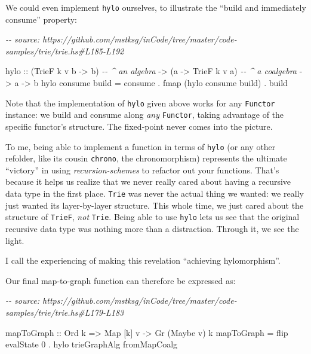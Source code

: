 \documentclass[]{article}
\newenvironment{Shaded}{}{}
\newcommand{\CommentTok}[1]{\textcolor[rgb]{0.38,0.63,0.69}{\textit{#1}}}
\newcommand{\DataTypeTok}[1]{\textcolor[rgb]{0.56,0.13,0.00}{#1}}
\newcommand{\DecValTok}[1]{\textcolor[rgb]{0.25,0.63,0.44}{#1}}
\newcommand{\FunctionTok}[1]{\textcolor[rgb]{0.02,0.16,0.49}{#1}}
\newcommand{\NormalTok}[1]{#1}
\newcommand{\OperatorTok}[1]{\textcolor[rgb]{0.40,0.40,0.40}{#1}}
\newcommand{\OtherTok}[1]{\textcolor[rgb]{0.00,0.44,0.13}{#1}}
\begin{document}
We could even implement \texttt{hylo} ourselves, to illustrate the ``build and
immediately consume'' property:

\begin{Shaded}
\begin{Highlighting}[]
\CommentTok{{-}{-} source: https://github.com/mstksg/inCode/tree/master/code{-}samples/trie/trie.hs\#L185{-}L192}

\NormalTok{hylo\textquotesingle{}}
\OtherTok{    ::}\NormalTok{ (}\DataTypeTok{TrieF}\NormalTok{ k v b }\OtherTok{{-}\textgreater{}}\NormalTok{ b)   }\CommentTok{{-}{-} \^{} an algebra}
    \OtherTok{{-}\textgreater{}}\NormalTok{ (a }\OtherTok{{-}\textgreater{}} \DataTypeTok{TrieF}\NormalTok{ k v a)   }\CommentTok{{-}{-} \^{} a coalgebra}
    \OtherTok{{-}\textgreater{}}\NormalTok{ a}
    \OtherTok{{-}\textgreater{}}\NormalTok{ b}
\NormalTok{hylo\textquotesingle{} consume build }\OtherTok{=}\NormalTok{ consume}
                    \OperatorTok{.} \FunctionTok{fmap}\NormalTok{ (hylo\textquotesingle{} consume build)}
                    \OperatorTok{.}\NormalTok{ build}
\end{Highlighting}
\end{Shaded}

Note that the implementation of \texttt{hylo} given above works for any
\texttt{Functor} instance: we build and consume along \emph{any}
\texttt{Functor}, taking advantage of the specific functor's structure. The
fixed-point never comes into the picture.

To me, being able to implement a function in terms of \texttt{hylo} (or any
other refolder, like its cousin \texttt{chrono}, the chronomorphism) represents
the ultimate ``victory'' in using \emph{recursion-schemes} to refactor out your
functions. That's because it helps us realize that we never really cared about
having a recursive data type in the first place. \texttt{Trie} was never the
actual thing we wanted: we really just wanted its layer-by-layer structure. This
whole time, we just cared about the structure of \texttt{TrieF}, \emph{not}
\texttt{Trie}. Being able to use \texttt{hylo} lets us see that the original
recursive data type was nothing more than a distraction. Through it, we see the
light.

I call the experiencing of making this revelation ``achieving hylomorphism''.

Our final map-to-graph function can therefore be expressed as:

\begin{Shaded}
\begin{Highlighting}[]
\CommentTok{{-}{-} source: https://github.com/mstksg/inCode/tree/master/code{-}samples/trie/trie.hs\#L179{-}L183}

\NormalTok{mapToGraph}
\OtherTok{    ::} \DataTypeTok{Ord}\NormalTok{ k}
    \OtherTok{=\textgreater{}} \DataTypeTok{Map}\NormalTok{ [k] v}
    \OtherTok{{-}\textgreater{}} \DataTypeTok{Gr}\NormalTok{ (}\DataTypeTok{Maybe}\NormalTok{ v) k}
\NormalTok{mapToGraph }\OtherTok{=} \FunctionTok{flip}\NormalTok{ evalState }\DecValTok{0} \OperatorTok{.}\NormalTok{ hylo trieGraphAlg fromMapCoalg}
\end{Highlighting}
\end{Shaded}
\end{document}
